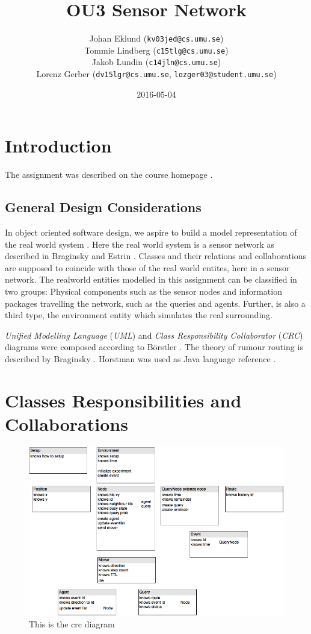 \documentclass[a4paper,11pt,twoside]{article}
\title{OU3 Sensor Network}
\author{Johan Eklund ({\tt{kv03jed@cs.umu.se}}) \\ 
Tommie Lindberg ({\tt{c15tlg@cs.umu.se}}) \\
Jakob Lundin ({\tt{c14jln@cs.umu.se}}) \\
Lorenz Gerber ({\tt{dv15lgr@cs.umu.se}}, {\tt{lozger03@student.umu.se}})
}
\date{2016-05-04}
\begin{document}
\lstset{language=C}
\maketitle
\thispagestyle{empty}
\newpage
\tableofcontents
\thispagestyle{empty}
\newpage

\clearpage
{}

\section{Introduction} 
The assignment was described on the course homepage
\cite{sensornetwork}. 

\subsection{General Design Considerations}
In object oriented software design, we aspire to build 
a model representation of the real world system \cite{roleplay}.  
Here the real world system is a sensor network as described in
Braginsky and Estrin \cite{braginsky2002}. Classes and their relations
and collaborations are supposed to coincide with those of the real
world entites, here in a sensor network. The realworld entities
modelled in this assignment can be classified in two groups: Physical
components such as the sensor nodes and information packages
travelling the network, such as the queries and agents. Further, is
also a third type, the environment entity which simulates the real
surrounding.



\textit{Unified Modelling Language}
(\textit{UML}) and \textit{Class Responsibility Collaborator}
(\textit{CRC}) diagrams were composed according to Börstler
\cite{roleplay}. The theory of rumour routing is described by Braginsky
\cite{braginsky2002}. Horstman was used as Java language reference
\cite{horstman2014}.


\section{Classes Responsibilities and Collaborations}

\begin{figure}
\centering
\includegraphics[width=\textwidth]{crc.png}
\caption{This is the crc diagram}
\label{fig:crc}
\end{figure}
\end{document}
